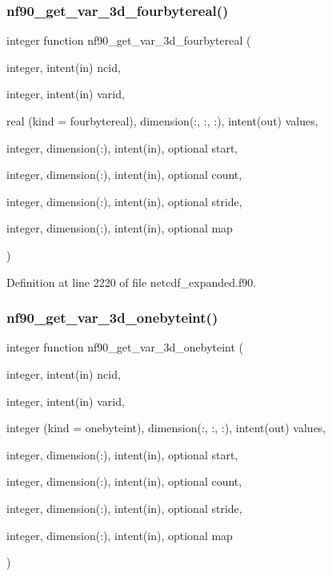 \subsubsection{\texorpdfstring{nf90\+\_\+get\+\_\+var\+\_\+3d\+\_\+fourbytereal()}{nf90\_get\_var\_3d\_fourbytereal()}}
{\footnotesize\ttfamily integer function nf90\+\_\+get\+\_\+var\+\_\+3d\+\_\+fourbytereal (\begin{DoxyParamCaption}\item[{integer, intent(in)}]{ncid,  }\item[{integer, intent(in)}]{varid,  }\item[{real (kind = fourbytereal), dimension(\+:, \+:, \+:), intent(out)}]{values,  }\item[{integer, dimension(\+:), intent(in), optional}]{start,  }\item[{integer, dimension(\+:), intent(in), optional}]{count,  }\item[{integer, dimension(\+:), intent(in), optional}]{stride,  }\item[{integer, dimension(\+:), intent(in), optional}]{map }\end{DoxyParamCaption})}



Definition at line 2220 of file netcdf\+\_\+expanded.\+f90.

\mbox{\label{netcdf__expanded_8f90_a3962ec1603eb3ebfd137988399204dc2}} 
\subsubsection{\texorpdfstring{nf90\+\_\+get\+\_\+var\+\_\+3d\+\_\+onebyteint()}{nf90\_get\_var\_3d\_onebyteint()}}
{\footnotesize\ttfamily integer function nf90\+\_\+get\+\_\+var\+\_\+3d\+\_\+onebyteint (\begin{DoxyParamCaption}\item[{integer, intent(in)}]{ncid,  }\item[{integer, intent(in)}]{varid,  }\item[{integer (kind = onebyteint), dimension(\+:, \+:, \+:), intent(out)}]{values,  }\item[{integer, dimension(\+:), intent(in), optional}]{start,  }\item[{integer, dimension(\+:), intent(in), optional}]{count,  }\item[{integer, dimension(\+:), intent(in), optional}]{stride,  }\item[{integer, dimension(\+:), intent(in), optional}]{map }\end{DoxyParamCaption})}



